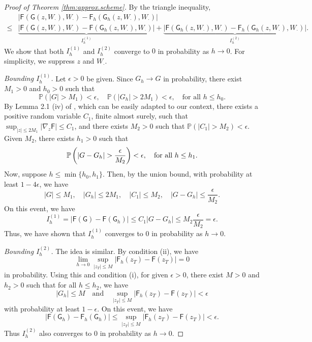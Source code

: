 \documentclass[twoside]{article}
\begin{document}
\begin{proof} [Proof of Theorem \ref{thm:approx.scheme}]
By the triangle inequality,
\begin{equation}
\begin{split}
&|\mathsf{F}(\mathsf{G}(z, W_{\cdot}), W_{\cdot}) - \mathsf{F}_h(\mathsf{G}_h(z, W_{\cdot}), W_{\cdot})| \\
\leq &
	\underbrace{
		|\mathsf{F}(\mathsf{G}(z, W_{\cdot}), W_{\cdot}) - \mathsf{F}(\mathsf{G}_h(z, W_{\cdot}), W_{\cdot})|
	}_{I_h^{(1)}} +
	\underbrace{
		|\mathsf{F}(\mathsf{G}_h(z, W_{\cdot}), W_{\cdot}) - \mathsf{F}_h(\mathsf{G}_h(z, W_{\cdot}), W_{\cdot})|
	}_{I_h^{(2)}}.
\end{split}
\end{equation}
We show that both $I_h^{(1)}$ and $I_h^{(2)}$ converge to $0$ in probability as $h \to 0$.
For simplicity, we suppress $z$ and $W_{\cdot}$.

{\it Bounding $I_h^{(1)}$.} 
Let $\epsilon > 0$ be given. 
Since $G_h \rightarrow G$ in probability, there exist $M_1 > 0$ and $h_0 > 0$ such that
\[
\mathbb{P}(|G| > M_1) < \epsilon, \quad \mathbb{P}(|G_h| > 2M_1) < \epsilon, \quad \text{for all } h \leq h_0.
\]
By Lemma 2.1 (iv) of \citet{ocone1989generalized}, which can be easily adapted to our context, there exists a positive random variable $C_1$, finite almost surely, such that $\sup_{|z| \leq 2 M_1} \left| \nabla_z \mathsf{F} \right| \leq C_1$, and there exists $M_2 > 0$ such that $\mathbb{P}( |C_1| > M_2 ) < \epsilon$. Given $M_2$, there exists $h_1 > 0$ such that
\[
\mathbb{P}\left( |G - G_h| > \frac{\epsilon}{M_2} \right) < \epsilon, \quad \text{for all } h \leq h_1.
\]
Now, suppose $h \leq \min\{h_0, h_1\}$. Then, by the union bound, with probability at least $1 - 4 \epsilon$, we have
\[
|G| \leq M_1, \quad  |G_h| \leq 2M_1, \quad |C_1| \leq M_2, \quad |G - G_h| \leq \frac{\epsilon}{M_2}.
\]	
On this event, we have
\[
I_h^{(1)} = |\mathsf{F}(\mathsf{G}) - \mathsf{F}(\mathsf{G}_h)| \leq C_1 |G - G_h| \leq M_2 \frac{\epsilon}{M_2} = \epsilon.
\]
Thus, we have shown that $I_h^{(1)}$ converges to $0$ in probability as $h \rightarrow 0$.

\medskip

{\it Bounding $I_h^{(2)}$.} The idea is similar. By condition (ii), we have
\[
\lim_{h \rightarrow 0} \sup_{|z_T|\leq M} |\mathsf{F}_h(z_T) - \mathsf{F}(z_T)| = 0
\]
in probability. 
Using this and condition (i), for given $\epsilon > 0$, there exist $M > 0$ and $h_2 > 0$ such that for all $h \le h_2$, we have
\[
|G_h| \leq M \quad \text{and} \quad \sup_{|z_T|\leq M} |\mathsf{F}_h(z_T) - \mathsf{F}(z_T)| < \epsilon
\]
with probability at least $1 - \epsilon$. On this event, we have
\[
|\mathsf{F}(\mathsf{G}_h) - \mathsf{F}_h(\mathsf{G}_h)| \leq \sup_{|z_T|\leq M} |\mathsf{F}_h(z_T) - \mathsf{F}(z_T)| < \epsilon.
\]
Thus $I_h^{(2)}$ also converges to $0$ in probability as $h\to 0$.
\end{proof}
\end{document}
